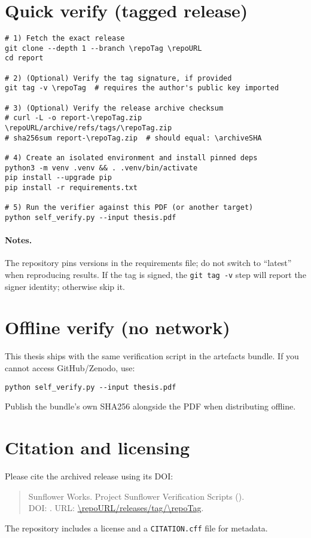 \documentclass[12pt,a4paper,openright]{book}
\begin{document}
    \section*{Quick verify (tagged release)}
\begin{verbatim}
# 1) Fetch the exact release
git clone --depth 1 --branch \repoTag \repoURL
cd report

# 2) (Optional) Verify the tag signature, if provided
git tag -v \repoTag  # requires the author's public key imported

# 3) (Optional) Verify the release archive checksum
# curl -L -o report-\repoTag.zip \repoURL/archive/refs/tags/\repoTag.zip
# sha256sum report-\repoTag.zip  # should equal: \archiveSHA

# 4) Create an isolated environment and install pinned deps
python3 -m venv .venv && . .venv/bin/activate
pip install --upgrade pip
pip install -r requirements.txt

# 5) Run the verifier against this PDF (or another target)
python self_verify.py --input thesis.pdf
\end{verbatim}

    \paragraph{Notes.}
    The repository pins versions in the requirements file; do not switch to ``latest'' when reproducing results.
    If the tag is signed, the \texttt{git tag -v} step will report the signer identity; otherwise skip it.

    \section*{Offline verify (no network)}
    This thesis ships with the same verification script in the artefacts bundle.
    If you cannot access GitHub/Zenodo, use:
\begin{verbatim}
python self_verify.py --input thesis.pdf
\end{verbatim}
    Publish the bundle’s own SHA256 alongside the PDF when distributing offline.

    \section*{Citation and licensing}
    Please cite the archived release using its DOI:
    \begin{quote}\small
    Sunflower Works.
    Project Sunflower Verification Scripts (\repoTag).\\
    DOI: \repoDOI. URL: \url{\repoURL/releases/tag/\repoTag}.
    \end{quote}
    The repository includes a license and a \texttt{CITATION.cff} file for metadata.
\end{document}
